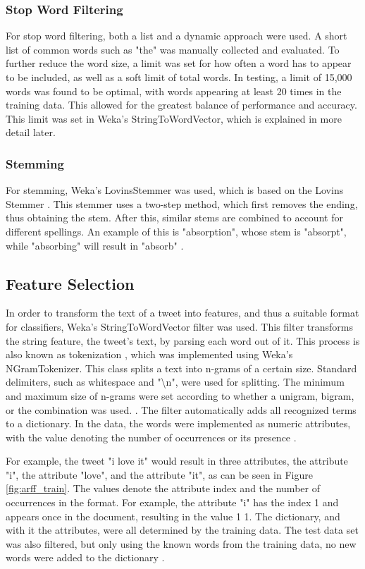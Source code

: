 \subsubsection{Stop Word Filtering}
For stop word filtering, both a list and a dynamic approach were used. A short list of common words such as "the" was manually collected and evaluated. To further reduce the word size, a limit was set for how often a word has to appear to be included, as well as a soft limit of total words. In testing, a limit of 15,000 words was found to be optimal, with words appearing at least 20 times in the training data. This allowed for the greatest balance of performance and accuracy. This limit was set in Weka's StringToWordVector, which is explained in more detail later.

\subsubsection{Stemming}
For stemming, Weka's LovinsStemmer was used, which is based on the Lovins Stemmer \cite{Weka}. This stemmer uses a two-step method, which first removes the ending, thus obtaining the stem. After this, similar stems are combined to account for different spellings. An example of this is "absorption", whose stem is "absorpt", while "absorbing" will result in "absorb" \cite{Lovins1968DevelopmentOA}.

\subsection{Feature Selection}
In order to transform the text of a tweet into features, and thus a suitable format for classifiers, Weka's StringToWordVector filter was used. This filter transforms the string feature, the tweet's text, by parsing each word out of it. This process is also known as tokenization \cite{DBLP:journals/csur/GiachanouC16}, which was implemented using Weka's NGramTokenizer. This class splits a text into n-grams of a certain size. Standard delimiters, such as whitespace and "\textbackslash n", were used for splitting. The minimum and maximum size of n-grams were set according to whether a unigram, bigram, or the combination was used. \cite{Weka}. The filter automatically adds all recognized terms to a dictionary. In the data, the words were implemented as numeric attributes, with the value denoting the number of occurrences or its presence \cite{Weka}.

For example, the tweet "i love it" would result in three attributes, the attribute "i", the attribute "love", and the attribute "it", as can be seen in Figure \ref{fig:arff_train}. The values denote the attribute index and the number of occurrences in the format. For example, the attribute "i" has the index 1 and appears once in the document, resulting in the value 1 1. The dictionary, and with it the attributes, were all determined by the training data. The test data set was also filtered, but only using the known words from the training data, no new words were added to the dictionary \cite{Weka}.

